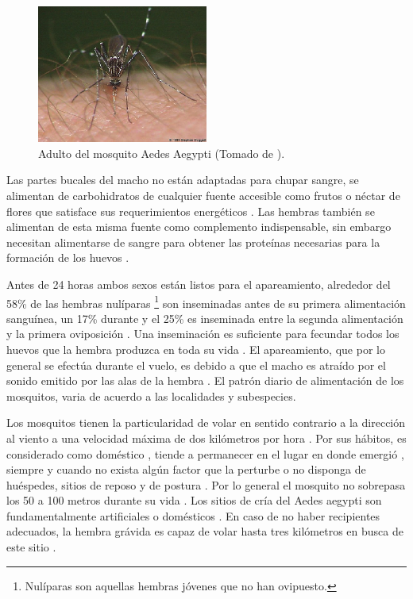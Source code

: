 \begin{figure}
\centering
\includegraphics[width=0.5\textwidth]{capitulo-3/graphics/adulto.png}
\caption{\label{fig:cap3-larvas} Adulto del mosquito Aedes Aegypti (Tomado de
\cite{directricesDetvArg}).}
\end{figure}

Las partes bucales del macho no están adaptadas para chupar sangre, se alimentan de carbohidratos
de cualquier fuente accesible como frutos o néctar de flores que satisface sus requerimientos
energéticos \cite{ThironIzcazaJ2003}. Las hembras también se alimentan de esta misma fuente como
complemento indispensable, sin embargo necesitan alimentarse de sangre para obtener las proteínas
necesarias para la formación de los huevos \cite{ThironIzcazaJ2003}.

Antes de 24 horas ambos sexos están listos para el apareamiento, alrededor del 58\% de las hembras
nulíparas \footnote{Nulíparas son aquellas hembras jóvenes que no han ovipuesto.} son inseminadas
antes de su primera alimentación sanguínea, un 17\% durante y el 25\% es inseminada entre la
segunda alimentación y la primera oviposición \cite{ThironIzcazaJ2003}. Una inseminación es
suficiente para fecundar todos los huevos que la hembra produzca en toda su vida
\cite{ThironIzcazaJ2003}. El apareamiento, que por lo general se efectúa durante el vuelo, es
debido a que el macho es atraído por el sonido emitido por las alas de la hembra
\cite{ThironIzcazaJ2003}. El patrón diario de alimentación de los mosquitos, varia de acuerdo a
las localidades y subespecies\cite{luevano1993ciclo}.

Los mosquitos tienen la particularidad de volar en sentido contrario a la dirección al viento
\cite{ThironIzcazaJ2003, web-site:speedAnimals} a una velocidad máxima de dos kilómetros por hora
\cite{web-site:speedAnimals,kaufmann2004flight}. Por sus hábitos, es considerado como doméstico
\cite{luevano1993ciclo}, tiende a permanecer en el lugar en donde emergió
\cite{cabezas2005dengue,ThironIzcazaJ2003}, siempre y cuando no exista algún factor que la
perturbe o no disponga de huéspedes, sitios de reposo y de postura  \cite{ThironIzcazaJ2003}. Por
lo general el mosquito no sobrepasa los 50 a 100 metros durante su vida \cite{cabezas2005dengue}.
Los sitios de cría del Aedes aegypti son fundamentalmente artificiales o domésticos
\cite{directricesDetvArg}. En caso de no haber recipientes adecuados, la hembra grávida es capaz
de volar hasta tres kilómetros en busca de este sitio \cite{ThironIzcazaJ2003}.

